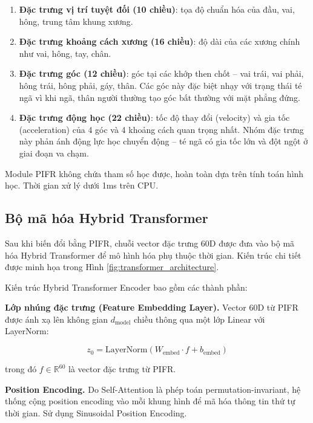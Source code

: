 \begin{enumerate}
    \item \textbf{Đặc trưng vị trí tuyệt đối (10 chiều)}: tọa độ chuẩn hóa của đầu, vai, hông, trung tâm khung xương.
    
    \item \textbf{Đặc trưng khoảng cách xương (16 chiều)}: độ dài của các xương chính như vai, hông, tay, chân.
    
    \item \textbf{Đặc trưng góc (12 chiều)}: góc tại các khớp then chốt -- vai trái, vai phải, hông trái, hông phải, gáy, thân. Các góc này đặc biệt nhạy với trạng thái té ngã vì khi ngã, thân người thường tạo góc bất thường với mặt phẳng đứng.
    
    \item \textbf{Đặc trưng động học (22 chiều)}: tốc độ thay đổi (velocity) và gia tốc (acceleration) của 4 góc và 4 khoảng cách quan trọng nhất. Nhóm đặc trưng này phản ánh động lực học chuyển động -- té ngã có gia tốc lớn và đột ngột ở giai đoạn va chạm.
\end{enumerate}

Module PIFR không chứa tham số học được, hoàn toàn dựa trên tính toán hình học. Thời gian xử lý dưới 1ms trên CPU.

\subsection{Bộ mã hóa Hybrid Transformer}
\label{sec:hybrid_transformer_detail}

Sau khi biến đổi bằng PIFR, chuỗi vector đặc trưng 60D được đưa vào bộ mã hóa Hybrid Transformer để mô hình hóa phụ thuộc thời gian. Kiến trúc chi tiết được minh họa trong Hình \ref{fig:transformer_architecture}.

Kiến trúc Hybrid Transformer Encoder bao gồm các thành phần:

\textbf{Lớp nhúng đặc trưng (Feature Embedding Layer).} Vector 60D từ PIFR được ánh xạ lên không gian $d_{\text{model}}$ chiều thông qua một lớp Linear với LayerNorm:

\begin{equation}
z_0 = \text{LayerNorm}(W_{\text{embed}} \cdot f + b_{\text{embed}})
\end{equation}

trong đó $f \in \mathbb{R}^{60}$ là vector đặc trưng từ PIFR.

\textbf{Position Encoding.} Do Self-Attention là phép toán permutation-invariant, hệ thống cộng position encoding vào mỗi khung hình để mã hóa thông tin thứ tự thời gian. Sử dụng Sinusoidal Position Encoding.

